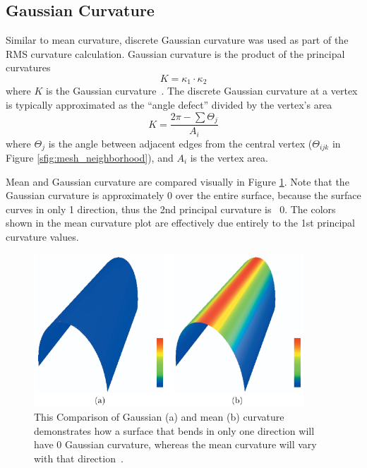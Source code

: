 \subsection{Gaussian Curvature}\label{sec:gauss_k}
Similar to mean curvature, discrete Gaussian curvature was used as part of the RMS curvature calculation.
Gaussian curvature is the product of the principal curvatures
\begin{equation}\label{eq:gauss_k}
	K = \kappa_1 \cdot \kappa_2
\end{equation}
where $K$ is the Gaussian curvature~\cite{TheoremaEgregium}.
The discrete Gaussian curvature at a vertex is typically approximated as the ``angle defect'' divided by the vertex's area
\begin{equation}\label{eq:disc_gauss_k}
	K = \frac{2\pi - \sum \Theta_j}{A_i}
\end{equation}
where $\Theta_j$ is the angle between adjacent edges from the central vertex ($\Theta_{ijk}$ in Figure \ref{sfig:mesh_neighborhood}), and $A_i$ is the vertex area.

Mean and Gaussian curvature are compared visually in Figure \ref{fig:mean_gauss_k}.
Note that the Gaussian curvature is approximately 0 over the entire surface, because the surface curves in only 1 direction, thus the 2nd principal curvature is ~0.
The colors shown in the mean curvature plot are effectively due entirely to the 1st principal curvature values.

\begin{figure}
	\centering
	\includegraphics[width=0.9\textwidth]{../resources/curvature/gaussian_mean_k.png}
	\caption{This Comparison of Gaussian (a) and mean (b) curvature demonstrates how a surface that bends in only one direction will have 0 Gaussian curvature, whereas the mean curvature will vary with that direction~\cite{Imp_k_estimation_for_WS}.}
	\label{fig:mean_gauss_k} %
\end{figure}

